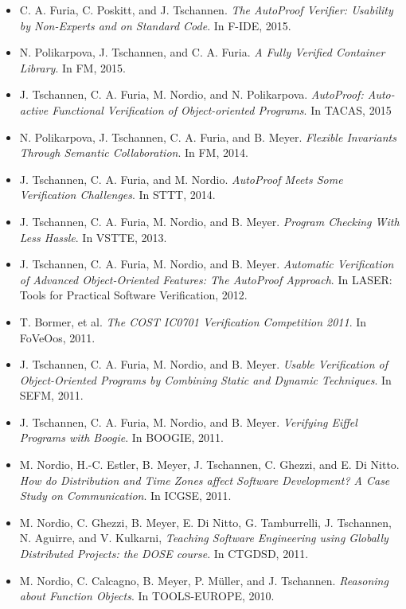 \begin{itemize}

  \item
  C. A. Furia, C. Poskitt, and J. Tschannen.
  \emph{The AutoProof Verifier: Usability by Non-Experts and on Standard Code}.
  In F-IDE, 2015.

  \item
  N. Polikarpova, J. Tschannen, and C. A. Furia.
  \emph{A Fully Verified Container Library}.
  In FM, 2015.

  \item
  J. Tschannen, C. A. Furia, M. Nordio, and N. Polikarpova. 
  \emph{AutoProof: Auto-active Functional Verification of Object-oriented Programs}.
  In TACAS, 2015

  \item
  N. Polikarpova, J. Tschannen, C. A. Furia, and B. Meyer.
  \emph{Flexible Invariants Through Semantic Collaboration}.
  In FM, 2014.

  \item
  J. Tschannen, C. A. Furia, and M. Nordio.
  \emph{AutoProof Meets Some Verification Challenges}.
  In STTT, 2014.

  \item
  J. Tschannen, C. A. Furia, M. Nordio, and B. Meyer.
  \emph{Program Checking With Less Hassle}.
  In VSTTE, 2013.

  \item
  J. Tschannen, C. A. Furia, M. Nordio, and B. Meyer.
  \emph{Automatic Verification of Advanced Object-Oriented Features: The AutoProof Approach}.
  In LASER: Tools for Practical Software Verification, 2012.

  \item
  T. Bormer, et al.
  \emph{The COST IC0701 Verification Competition 2011}.
  In FoVeOos, 2011.

  \item
  J. Tschannen, C. A. Furia, M. Nordio, and B. Meyer.
  \emph{Usable Verification of Object-Oriented Programs by Combining Static and Dynamic Techniques}.
  In SEFM, 2011.

  \item
  J. Tschannen, C. A. Furia, M. Nordio, and B. Meyer.
  \emph{Verifying Eiffel Programs with Boogie}.
  In BOOGIE, 2011.

  \item
  M. Nordio, H.-C. Estler, B. Meyer, J. Tschannen, C. Ghezzi, and E. Di Nitto.
  \emph{How do Distribution and Time Zones affect Software Development? A Case Study on Communication}.
  In ICGSE, 2011.

  \item
  M. Nordio, C. Ghezzi, B. Meyer, E. Di Nitto, G. Tamburrelli, J. Tschannen, N. Aguirre, and V. Kulkarni,
  \emph{Teaching Software Engineering using Globally Distributed Projects: the DOSE course}.
  In CTGDSD, 2011.

  \item
  M. Nordio, C. Calcagno, B. Meyer, P. M\"uller, and J. Tschannen.
  \emph{Reasoning about Function Objects}.
  In TOOLS-EUROPE, 2010.

\end{itemize}
